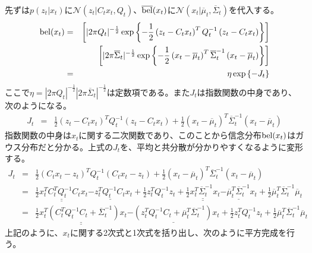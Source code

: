 \documentclass[dvipdfmx,a4paper]{jsarticle}
\begin{document}
先ずは$p(z_t | x_t)$に$\mathcal{N}(z_t | C_t x_t, Q_t)$、$\operatorname{\overline{bel}}(x_t)$に$\mathcal{N}(x_t | \overline{\mu}_t, \overline{\Sigma}_t)$を代入する。
\begin{eqnarray}
	\operatorname{bel}(x_t) &=& \left[ |2 \pi Q_t|^{-\frac{1}{2}} \exp \left\{ -\frac{1}{2} \left( z_t - C_t x_t \right)^T Q_t^{-1} \left( z_t - C_t x_t \right) \right\} \right] \nonumber \\
	&& \qquad \left[ |2 \pi \overline{\Sigma}_t|^{-\frac{1}{2}} \exp \left\{ -\frac{1}{2} \left( x_t - \overline{\mu}_t \right)^T \overline{\Sigma}_t^{-1} \left( x_t - \overline{\mu}_t \right) \right\} \right] \nonumber \\
	&=& \eta \exp \left\{ -J_t \right\} 
\end{eqnarray}
ここで$\eta = |2 \pi Q_t|^{-\frac{1}{2}} |2 \pi \overline{\Sigma}_t|^{-\frac{1}{2}}$は定数項である。また$J_t$は指数関数の中身であり、次のようになる。
\begin{eqnarray}
	J_t &=& \frac{1}{2} \left( z_t - C_t x_t \right)^T Q_t^{-1} \left( z_t - C_t x_t \right) + \frac{1}{2} \left( x_t - \overline{\mu}_t \right)^T \overline{\Sigma}_t^{-1} \left( x_t - \overline{\mu}_t \right)
\end{eqnarray}
指数関数の中身は$x_t$に関する二次関数であり、このことから信念分布$\operatorname{bel}(x_t)$はガウス分布だと分かる。上式の$J_t$を、平均と共分散が分かりやすくなるように変形する。
\begin{eqnarray}
	J_t &=& \frac{1}{2} \left( C_t x_t - z_t \right)^T Q_t^{-1} \left( C_t x_t - z_t \right) + \frac{1}{2} \left( x_t - \overline{\mu}_t \right)^T \overline{\Sigma}_t^{-1} \left( x_t - \overline{\mu}_t \right) \nonumber \\
	&=& \underline{\underline{\frac{1}{2} x_t^T C_t^T Q_t^{-1} C_t x_t}} \underline{-z_t^T Q_t^{-1} C_t x_t} + \frac{1}{2} z_t^T Q_t^{-1} z_t + \underline{\underline{\frac{1}{2} x_t^T \overline{\Sigma}_t^{-1} x_t}} \underline{-\overline{\mu}_t^T \overline{\Sigma}_t^{-1} x_t} + \frac{1}{2} \overline{\mu}_t^T \overline{\Sigma}_t^{-1} \overline{\mu}_t \\
	&=& \underline{\underline{\frac{1}{2} x_t^T \left( C_t^T Q_t^{-1} C_t + \overline{\Sigma}_t^{-1} \right) x_t}} \underline{-\left( z_t^T Q_t^{-1} C_t + \overline{\mu}_t^T \overline{\Sigma}_t^{-1} \right) x_t} + \frac{1}{2} z_t^T Q_t^{-1} z_t + \frac{1}{2} \overline{\mu}_t^T \overline{\Sigma}_t^{-1} \overline{\mu}_t
\end{eqnarray}
上記のように、$x_t$に関する2次式と1次式を括り出し、次のように平方完成を行う。
\end{document}
